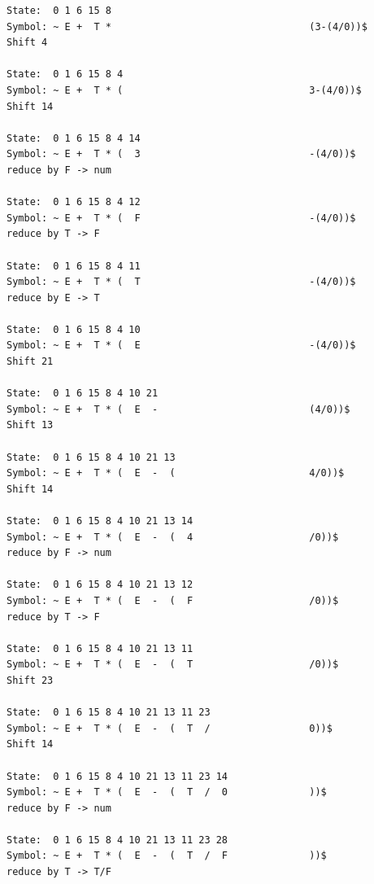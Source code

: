 \documentclass[lang=cn,11pt,a4paper]{elegantpaper}
\begin{document}
\begin{lstlisting}[language=text]
State:  0 1 6 15 8                                
Symbol: ~ E +  T *                                 	(3-(4/0))$                    	Shift 4

State:  0 1 6 15 8 4                              
Symbol: ~ E +  T * (                               	3-(4/0))$                     	Shift 14

State:  0 1 6 15 8 4 14                           
Symbol: ~ E +  T * (  3                            	-(4/0))$                      	reduce by F -> num

State:  0 1 6 15 8 4 12                           
Symbol: ~ E +  T * (  F                            	-(4/0))$                      	reduce by T -> F

State:  0 1 6 15 8 4 11                           
Symbol: ~ E +  T * (  T                            	-(4/0))$                      	reduce by E -> T

State:  0 1 6 15 8 4 10                           
Symbol: ~ E +  T * (  E                            	-(4/0))$                      	Shift 21

State:  0 1 6 15 8 4 10 21                        
Symbol: ~ E +  T * (  E  -                         	(4/0))$                       	Shift 13

State:  0 1 6 15 8 4 10 21 13                     
Symbol: ~ E +  T * (  E  -  (                      	4/0))$                        	Shift 14

State:  0 1 6 15 8 4 10 21 13 14                  
Symbol: ~ E +  T * (  E  -  (  4                   	/0))$                         	reduce by F -> num

State:  0 1 6 15 8 4 10 21 13 12                  
Symbol: ~ E +  T * (  E  -  (  F                   	/0))$                         	reduce by T -> F

State:  0 1 6 15 8 4 10 21 13 11                  
Symbol: ~ E +  T * (  E  -  (  T                   	/0))$                         	Shift 23

State:  0 1 6 15 8 4 10 21 13 11 23               
Symbol: ~ E +  T * (  E  -  (  T  /                	0))$                          	Shift 14

State:  0 1 6 15 8 4 10 21 13 11 23 14            
Symbol: ~ E +  T * (  E  -  (  T  /  0             	))$                           	reduce by F -> num

State:  0 1 6 15 8 4 10 21 13 11 23 28            
Symbol: ~ E +  T * (  E  -  (  T  /  F             	))$                           	reduce by T -> T/F


\end{lstlisting}
\end{document}

